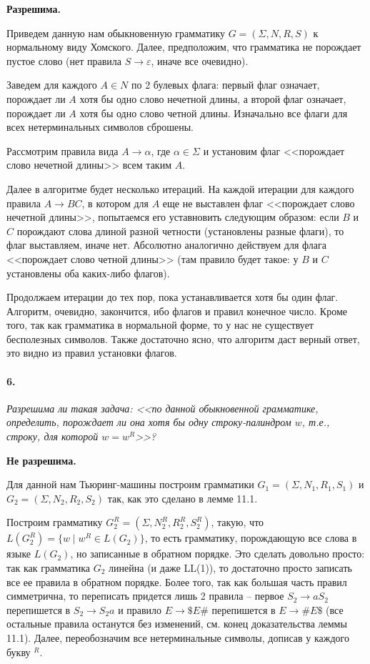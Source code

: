 \documentclass[russian,table]{article}
\begin{document}
\textbf{Разрешима.}

Приведем данную нам обыкновенную грамматику $G = (\Sigma,N,R,S)$ к нормальному виду Хомского. Далее, предположим, что грамматика не порождает пустое слово (нет правила $S \to \varepsilon$, иначе все очевидно).

Заведем для каждого $A \in N$ по 2 булевых флага: первый флаг означает, порождает ли $A$ хотя бы одно слово нечетной длины, а второй флаг означает, порождает ли $A$ хотя бы одно слово четной длины. Изначально все флаги для всех нетерминальных символов сброшены.

Рассмотрим правила вида $A \to \alpha$, где $\alpha \in \Sigma$ и установим флаг <<порождает слово нечетной длины>> всем таким $A$.

Далее в алгоритме будет несколько итераций. На каждой итерации для каждого правила $A \to BC$, в котором для $A$ еще не выставлен флаг <<порождает слово нечетной длины>>, попытаемся его уставновить следующим образом: если $B$ и $C$ порождают слова длиной разной четности (установлены разные флаги), то флаг выставляем, иначе нет. Абсолютно аналогично действуем для флага <<порождает слово четной длины>> (там правило будет такое: у $B$ и $C$ установлены оба каких-либо флагов).

Продолжаем итерации до тех пор, пока устанавливается хотя бы один флаг. Алгоритм, очевидно, закончится, ибо флагов и правил конечное число. Кроме того, так как грамматика в нормальной форме, то у нас не существует бесполезных символов.
Также достаточно ясно, что алгоритм даст верный ответ, это видно из правил установки флагов.

\paragraph*{6.} \textit{Разрешима ли такая задача: <<по данной обыкновенной грамматике, определить, порождает ли она хотя бы одну строку-палиндром $w$, т.е., строку, для которой $w = w^R$>>?}

\textbf{Не разрешима.}

Для данной нам Тьюринг-машины построим грамматики $G_1 = (\Sigma, N_1, R_1, S_1)$ и $G_2 = (\Sigma, N_2, R_2, S_2)$ так, как это сделано в лемме 11.1.

Построим грамматику $G_2^R = (\Sigma, N_2^R, R_2^R, S_2^R)$, такую, что $L(G_2^R) = \{ w \mid w^R \in L(G_2) \}$, то есть грамматику, порождающую все слова в языке $L(G_2)$, но записанные в обратном порядке. Это сделать довольно просто: так как грамматика $G_2$ линейна (и даже LL(1)), то достаточно просто записать все ее правила в обратном порядке. Более того, так как большая часть правил симметрична, то переписать придется лишь 2 правила -- первое $S_2 \to aS_2$ перепишется в $S_2 \to S_2a$ и правило $E \to \$E\#$ перепишется в $E \to \#E\$$ (все остальные правила останутся без изменений, см. конец доказательства леммы 11.1). Далее, переобозначим все нетерминальные символы, дописав у каждого букву $^R$.
\end{document}
